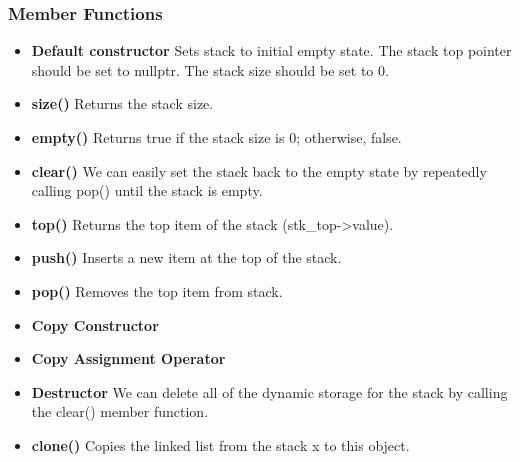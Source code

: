 \documentclass{report}
\begin{document}
    \subsubsection{Member Functions}
    \begin{itemize}
        \item \textbf{Default constructor} Sets stack to initial empty state. The stack top pointer should be set to nullptr. The stack size should be set to 0.
        \item \textbf{size()} Returns the stack size.
        \item \textbf{empty()} Returns true if the stack size is 0; otherwise, false.
        \item \textbf{clear()} We can easily set the stack back to the empty state by repeatedly calling pop() until the stack is empty.
        \item \textbf{top()} Returns the top item of the stack (stk\_top->value).
        \item \textbf{push()} Inserts a new item at the top of the stack.
        \item \textbf{pop()} Removes the top item from stack.
        \item \textbf{Copy Constructor}
        \item \textbf{Copy Assignment Operator}
        \item \textbf{Destructor} We can delete all of the dynamic storage for the stack by calling the clear() member function.
        \item \textbf{clone()} Copies the linked list from the stack x to this object.
    \end{itemize}

    \pagebreak
\end{document}
